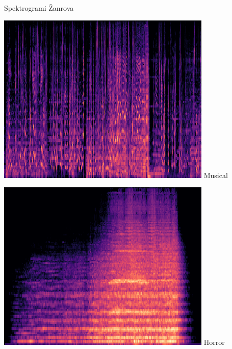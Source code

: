 \documentclass{beamer}
\begin{document}
\begin{frame}{Spektrogrami Žanrova}
\centering

\begin{minipage}{0.4\linewidth}
  \includegraphics[width=\linewidth]{slike/musical23.png}
	Musical
\end{minipage}%
\begin{minipage}{0.4\linewidth}
  \includegraphics[width=\linewidth]{slike/horror30.png}
	Horror
\end{minipage}%
\end{frame}
\end{document}
